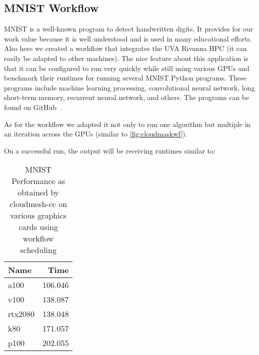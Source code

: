 
\subsection{MNIST Workflow}\label{mnist-workflow}

MNIST is a well-known program to detect handwritten digits. It
provides for our work value because it is well understood and is used
in many educational efforts. Also here we created a workflow that
integrates the UVA Rivanna HPC (it can easily be adapted to other machines).
The nice feature about this application is that it can be configured
to run very quickly while still using various GPUs and benchmark their runtimes for running
several MNIST Python programs. These programs include machine learning
processing, convolutional neural network, long short-term memory,
recurrent neural network, and others. The programs can be found on
GitHub~\cite{www-mnist-programs}.

As for the workflow we adapted it not only to run one algorithm but
multiple in an iteration across the GPUs (similar to \ref{fig:cloudmaskwf}).

On a successful run, the output will be receiving runtimes similar to:

\begin{table}[!ht]
\caption{MNIST Performance as obtained by cloudmesh-cc on various graphics cards using workflow scheduling}
    \centering
    \begin{tabular}{lr}
    \hline
        Name & Time \\ \hline
        a100 & 106.046 \\ 
        v100 & 138.087 \\ 
        rtx2080 & 138.048 \\
        k80 & 171.057 \\ 
        p100 & 202.055 \\
    \end{tabular}
    \label{table:mnist-times}
  \end{table}
  
